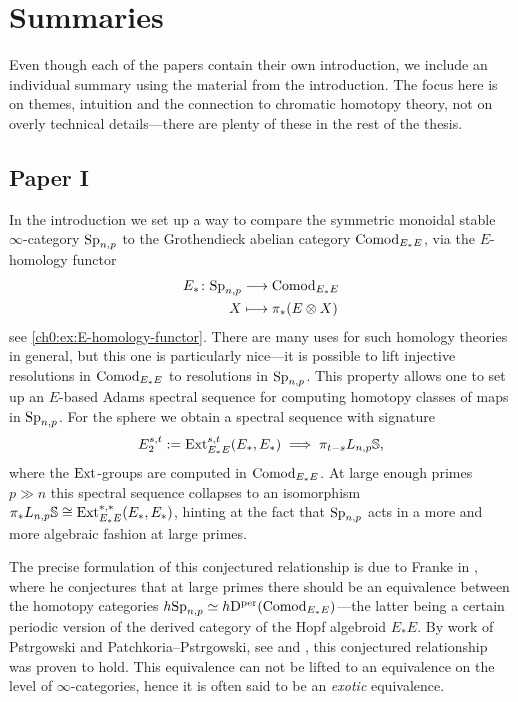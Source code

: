 \section{Summaries}

Even though each of the papers contain their own introduction, we include an individual summary using the material from the introduction. The focus here is on themes, intuition and the connection to chromatic homotopy theory, not on overly technical details---there are plenty of these in the rest of the thesis. 

\subsection{Paper I}

In the introduction we set up a way to compare the symmetric monoidal stable $\infty$-category $\mathrm{Sp}_{n,p}$ to the Grothendieck abelian category $\mathrm{Comod}_{E_*E}$, via the $E$-homology functor
\begin{align*}
    E_*\colon \mathrm{Sp}_{n,p} &\longrightarrow \mathrm{Comod}_{E_*E} \\
    X &\longmapsto \pi_*(E\otimes X)
\end{align*}
see \cref{ch0:ex:E-homology-functor}. There are many uses for such homology theories in general, but this one is particularly nice---it is possible to lift injective resolutions in $\mathrm{Comod}_{E_*E}$ to resolutions in $\mathrm{Sp}_{n,p}$. This property allows one to set up an $E$-based Adams spectral sequence for computing homotopy classes of maps in $\mathrm{Sp}_{n,p}$. For the sphere we obtain a spectral sequence with signature 
\[E_2^{s,t} := \operatorname{Ext}^{s,t}_{E_*E}(E_*, E_*) \implies \pi_{t-s}L_{n,p} \mathbb{S},\]
where the $\operatorname{Ext}$-groups are computed in $\mathrm{Comod}_{E_*E}$. At large enough primes $p \gg n$ this spectral sequence collapses to an isomorphism $\pi_* L_{n,p} \mathbb{S} \cong \operatorname{Ext}_{E_*E}^{*,*}(E_*, E_*)$, hinting at the fact that $\mathrm{Sp}_{n,p}$ acts in a more and more algebraic fashion at large primes. 

The precise formulation of this conjectured relationship is due to Franke in \cite{franke_96}, where he conjectures that at large primes there should be an equivalence between the homotopy categories $h\mathrm{Sp}_{n,p} \simeq h\mathrm{D}^{\mathrm{per}}(\mathrm{Comod}_{E_*E})$---the latter being a certain periodic version of the derived category of the Hopf algebroid $E_*E$. By work of Pstr\a{}gowski and Patchkoria--Pstr\a{}gowski, see \cite{pstragowski_2021} and \cite{patchkoria-pstragowski_2021}, this conjectured relationship was proven to hold. This equivalence can not be lifted to an equivalence on the level of $\infty$-categories, hence it is often said to be an \emph{exotic} equivalence. 

